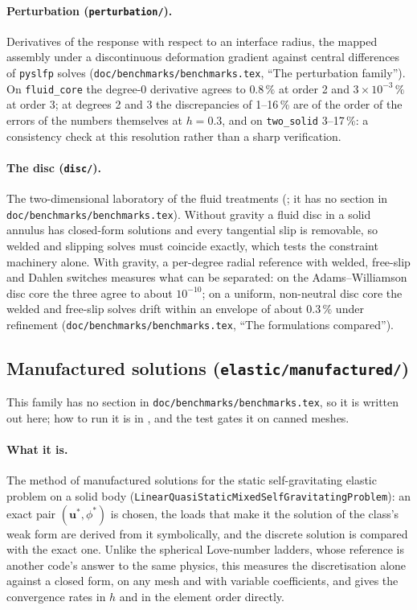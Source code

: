 \documentclass[11pt]{article}
\numberwithin{equation}{section}
\newcommand{\vu}{\mathbf{u}}
\newcommand{\code}[1]{\texttt{#1}}
\begin{document}
\paragraph{Perturbation (\code{perturbation/}).} Derivatives of the response
with respect to an interface radius, the mapped assembly under a
discontinuous deformation gradient against central differences of
\code{pyslfp} solves (\code{doc/benchmarks/benchmarks.tex}, ``The perturbation
family''). On \code{fluid\_core} the degree-0 derivative agrees to
$0.8\,\%$ at order 2 and $3\times10^{-3}\,\%$ at order 3; at degrees 2 and 3
the discrepancies of 1--16\,\% are of the order of the errors of the
numbers themselves at $h=0.3$, and on \code{two\_solid} 3--17\,\%: a
consistency check at this resolution rather than a sharp verification.

\paragraph{The disc (\code{disc/}).} The two-dimensional laboratory of the
fluid treatments (; it has no section in
\code{doc/benchmarks/benchmarks.tex}). Without gravity a fluid disc in a solid annulus
has closed-form solutions and every tangential slip is removable, so
welded and slipping solves must coincide exactly, which tests the constraint
machinery alone. With gravity, a per-degree radial reference with welded,
free-slip and Dahlen switches measures what can be separated: on the
Adams--Williamson disc core the three agree to about $10^{-10}$; on a
uniform, non-neutral disc core the welded and free-slip solves drift within
an envelope of about $0.3\,\%$ under refinement
(\code{doc/benchmarks/benchmarks.tex}, ``The formulations compared'').

\subsection{Manufactured solutions (\code{elastic/manufactured/})}
\label{sec:manufactured}

This family has no section in \code{doc/benchmarks/benchmarks.tex}, so it is written
out here; how to run it is in
, and the test
 gates it on canned meshes.

\paragraph{What it is.} The method of manufactured solutions for the static
self-gravitating elastic problem on a solid body
(\code{LinearQuasiStaticMixedSelfGravitatingProblem}): an exact pair
$(\vu^*,\phi^*)$ is chosen, the loads that make it the solution of the
class's weak form are derived from it symbolically, and the discrete
solution is compared with the exact one. Unlike the spherical Love-number
ladders, whose reference is another code's answer to the same physics, this
measures the discretisation alone against a closed form, on any mesh and
with variable coefficients, and gives the convergence rates in $h$ and in
the element order directly.
\end{document}
